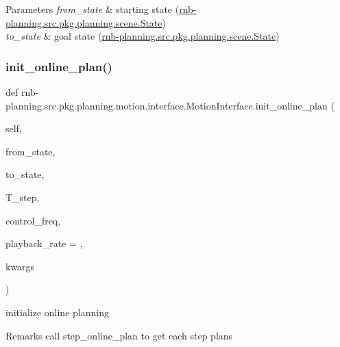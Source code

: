 \begin{DoxyParams}{Parameters}
{\em from\+\_\+state} & starting state (\hyperlink{classrnb-planning_1_1src_1_1pkg_1_1planning_1_1scene_1_1_state}{rnb-\/planning.\+src.\+pkg.\+planning.\+scene.\+State}) \\
\hline
{\em to\+\_\+state} & goal state (\hyperlink{classrnb-planning_1_1src_1_1pkg_1_1planning_1_1scene_1_1_state}{rnb-\/planning.\+src.\+pkg.\+planning.\+scene.\+State}) \\
\hline
\end{DoxyParams}
\mbox{\label{classrnb-planning_1_1src_1_1pkg_1_1planning_1_1motion_1_1interface_1_1_motion_interface_ab3f280a7ce0edc02536790ab81736539}} 
\subsubsection{\texorpdfstring{init\+\_\+online\+\_\+plan()}{init\_online\_plan()}}
{\footnotesize\ttfamily def rnb-\/planning.\+src.\+pkg.\+planning.\+motion.\+interface.\+Motion\+Interface.\+init\+\_\+online\+\_\+plan (\begin{DoxyParamCaption}\item[{}]{self,  }\item[{}]{from\+\_\+state,  }\item[{}]{to\+\_\+state,  }\item[{}]{T\+\_\+step,  }\item[{}]{control\+\_\+freq,  }\item[{}]{playback\+\_\+rate = {},  }\item[{}]{kwargs }\end{DoxyParamCaption})}



initialize online planning 

\begin{DoxyRemark}{Remarks}
call step\+\_\+online\+\_\+plan to get each step plans 
\end{DoxyRemark}

